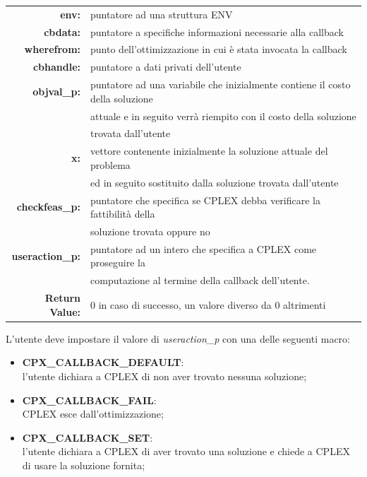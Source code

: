 \begin{table}[h]
\centering
\begin{tabular}{rl}
\textbf{env:} & {puntatore ad una struttura ENV}\\
\textbf{cbdata:} & {puntatore a specifiche informazioni necessarie alla callback}\\
\textbf{wherefrom:} & {punto dell'ottimizzazione in cui è stata invocata la callback} \\ 
\textbf{cbhandle:} & {puntatore a dati privati dell'utente}\\
\textbf{objval\_p:} & {puntatore ad una variabile che inizialmente contiene il costo della soluzione}\\
&{attuale e in seguito verrà riempito con il costo della soluzione}\\
&{trovata dall'utente}\\
\textbf{x:} & {vettore contenente inizialmente la soluzione attuale del problema}\\
&{ed in seguito sostituito dalla soluzione trovata dall'utente}\\
\textbf{checkfeas\_p:} & {puntatore che specifica se CPLEX debba verificare la fattibilità della}\\
&{soluzione trovata oppure no}\\
\textbf{useraction\_p:} & {puntatore ad un intero che specifica a CPLEX come proseguire la }\\
&{computazione al termine della callback dell'utente.}\\
\textbf{Return Value:} & {0 in caso di successo, un valore diverso da 0 altrimenti}\\
\end{tabular}
\end{table}

L'utente deve impostare il valore di \textit{useraction\_p} con una delle seguenti macro:
\begin{itemize}
\item{\textbf{CPX\_CALLBACK\_DEFAULT}:\\
l'utente dichiara a CPLEX di non aver trovato nessuna soluzione;}
\item{\textbf{CPX\_CALLBACK\_FAIL}:\\
CPLEX esce dall'ottimizzazione;}
\item{\textbf{CPX\_CALLBACK\_SET}:\\
l'utente dichiara a CPLEX di aver trovato una soluzione e chiede  a CPLEX di usare la soluzione fornita;}
\end{itemize}

